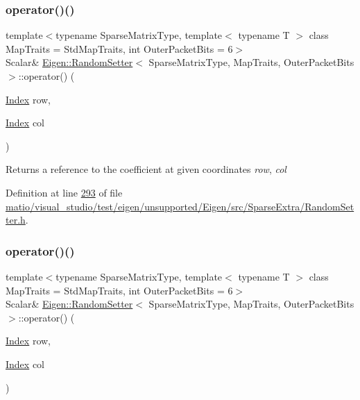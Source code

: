 \subsubsection{\texorpdfstring{operator()()}{operator()()}\hspace{0.1cm}{\footnotesize\ttfamily [1/2]}}
{\footnotesize\ttfamily template$<$typename Sparse\+Matrix\+Type, template$<$ typename T $>$ class Map\+Traits = Std\+Map\+Traits, int Outer\+Packet\+Bits = 6$>$ \\
Scalar\& \hyperlink{class_eigen_1_1_random_setter}{Eigen\+::\+Random\+Setter}$<$ Sparse\+Matrix\+Type, Map\+Traits, Outer\+Packet\+Bits $>$\+::operator() (\begin{DoxyParamCaption}\item[{\hyperlink{namespace_eigen_a62e77e0933482dafde8fe197d9a2cfde}{Index}}]{row,  }\item[{\hyperlink{namespace_eigen_a62e77e0933482dafde8fe197d9a2cfde}{Index}}]{col }\end{DoxyParamCaption})\hspace{0.3cm}{\ttfamily [inline]}}

\begin{DoxyReturn}{Returns}
a reference to the coefficient at given coordinates {\itshape row}, {\itshape col} 
\end{DoxyReturn}


Definition at line \hyperlink{matio_2visual__studio_2test_2eigen_2unsupported_2_eigen_2src_2_sparse_extra_2_random_setter_8h_source_l00293}{293} of file \hyperlink{matio_2visual__studio_2test_2eigen_2unsupported_2_eigen_2src_2_sparse_extra_2_random_setter_8h_source}{matio/visual\+\_\+studio/test/eigen/unsupported/\+Eigen/src/\+Sparse\+Extra/\+Random\+Setter.\+h}.

\mbox{\label{class_eigen_1_1_random_setter_a77dcbbc964b42027e00af269a5147c68}} 
\subsubsection{\texorpdfstring{operator()()}{operator()()}\hspace{0.1cm}{\footnotesize\ttfamily [2/2]}}
{\footnotesize\ttfamily template$<$typename Sparse\+Matrix\+Type, template$<$ typename T $>$ class Map\+Traits = Std\+Map\+Traits, int Outer\+Packet\+Bits = 6$>$ \\
Scalar\& \hyperlink{class_eigen_1_1_random_setter}{Eigen\+::\+Random\+Setter}$<$ Sparse\+Matrix\+Type, Map\+Traits, Outer\+Packet\+Bits $>$\+::operator() (\begin{DoxyParamCaption}\item[{\hyperlink{namespace_eigen_a62e77e0933482dafde8fe197d9a2cfde}{Index}}]{row,  }\item[{\hyperlink{namespace_eigen_a62e77e0933482dafde8fe197d9a2cfde}{Index}}]{col }\end{DoxyParamCaption})\hspace{0.3cm}{\ttfamily [inline]}}

